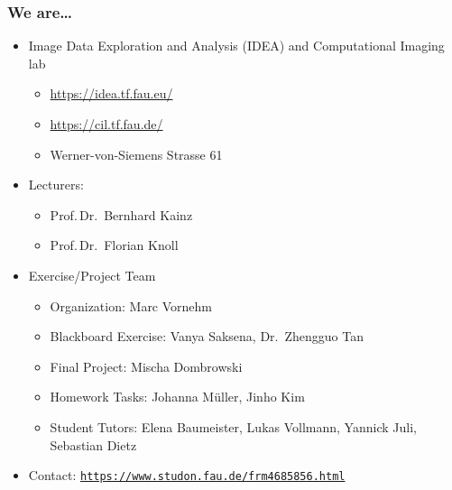 

\subtitle{Motivation}




\nocite{*}

\frame[plain,c]{\titlepage} %

\begin{frame}
	\frametitle{We are\ldots}
	\begin{itemize}
		\setlength\itemsep{0.3cm}
		\item Image Data Exploration and Analysis (IDEA) and Computational Imaging lab
		\begin{itemize}
			\item \url{https://idea.tf.fau.eu/}
			\item \url{https://cil.tf.fau.de/}
			\item Werner-von-Siemens Strasse 61
		\end{itemize}
		\item Lecturers:
		\begin{itemize}
			\item Prof.\,Dr.\ Bernhard Kainz
			\item Prof.\,Dr.\ Florian Knoll
		\end{itemize}
		\item Exercise/Project Team
		\begin{itemize}
			\item Organization: \tabto{3cm} Marc Vornehm
			\item Blackboard Exercise: \tabto{3cm} Vanya Saksena, Dr.\ Zhengguo Tan
			\item Final Project: \tabto{3cm} Mischa Dombrowski
			\item Homework Tasks: \tabto{3cm} Johanna M\"uller, Jinho Kim
			\item Student Tutors: \tabto{3cm} Elena Baumeister, Lukas Vollmann, Yannick Juli, Sebastian Dietz
		\end{itemize}
		\item Contact: \texttt{\url{https://www.studon.fau.de/frm4685856.html}}
	\end{itemize}
\end{frame}

